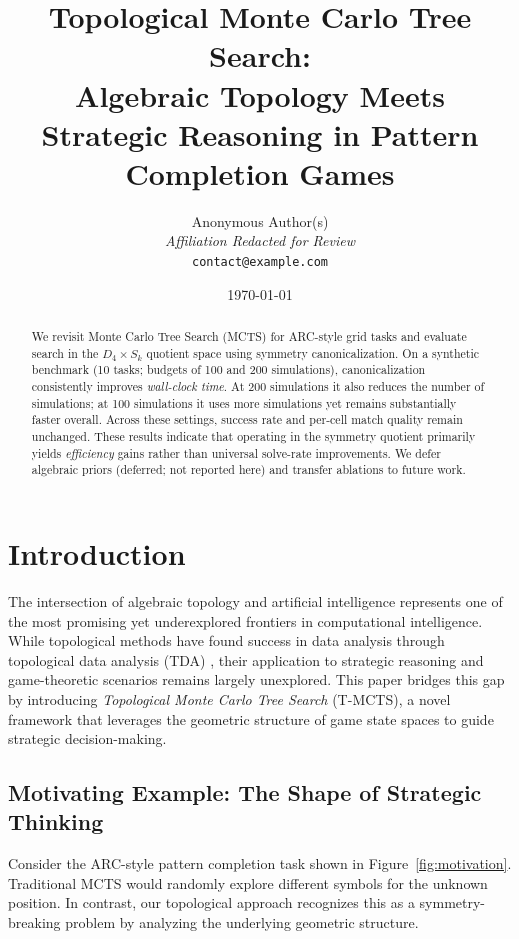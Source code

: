 \documentclass{article}
\title{Topological Monte Carlo Tree Search: \\
Algebraic Topology Meets Strategic Reasoning in Pattern Completion Games}
\author{
Anonymous Author(s)\\
\textit{Affiliation Redacted for Review}\\
\texttt{contact@example.com}
}
\date{\today}
\begin{document}
\maketitle

\begin{abstract}
We revisit Monte Carlo Tree Search (MCTS) for ARC-style grid tasks and evaluate search in the $D_4 \times S_k$ quotient space using symmetry canonicalization. On a synthetic benchmark (10 tasks; budgets of 100 and 200 simulations), canonicalization consistently improves \emph{wall-clock time}. At 200 simulations it also reduces the number of simulations; at 100 simulations it uses more simulations yet remains substantially faster overall. Across these settings, success rate and per-cell match quality remain unchanged. These results indicate that operating in the symmetry quotient primarily yields \emph{efficiency} gains rather than universal solve-rate improvements. We defer algebraic priors (deferred; not reported here) and transfer ablations to future work.
\end{abstract}

\section{Introduction}

The intersection of algebraic topology and artificial intelligence represents one of the most promising yet underexplored frontiers in computational intelligence. While topological methods have found success in data analysis through topological data analysis (TDA) \citep{carlsson2009topology}, their application to strategic reasoning and game-theoretic scenarios remains largely unexplored. This paper bridges this gap by introducing \emph{Topological Monte Carlo Tree Search} (T-MCTS), a novel framework that leverages the geometric structure of game state spaces to guide strategic decision-making.

\subsection{Motivating Example: The Shape of Strategic Thinking}

Consider the ARC-style pattern completion task shown in Figure~\ref{fig:motivation}. Traditional MCTS would randomly explore different symbols for the unknown position. In contrast, our topological approach recognizes this as a symmetry-breaking problem by analyzing the underlying geometric structure.
\end{document}
